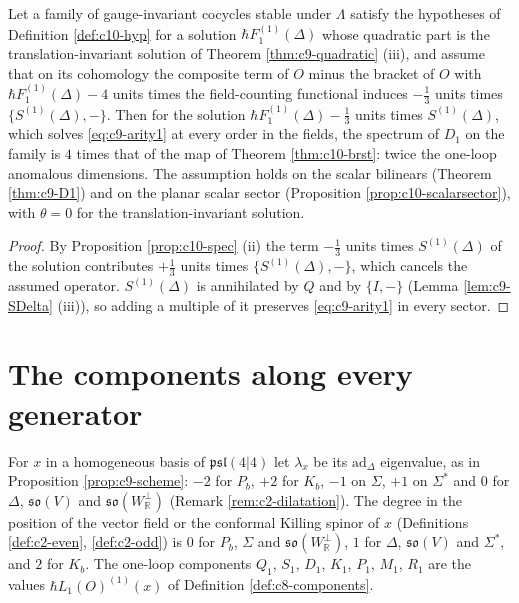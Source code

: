 \begin{corollary}
\label{cor:c10-P7}
Let a family of gauge-invariant cocycles stable under $\Lambda$ satisfy the hypotheses of Definition \ref{def:c10-hyp} for a solution $\hbar F_1^{(1)}(\Delta)$ whose quadratic part is the translation-invariant solution of Theorem \ref{thm:c9-quadratic} (iii), and assume that on its cohomology the composite term of $O$ minus the bracket of $O$ with $\hbar F_1^{(1)}(\Delta)-4$ units times the field-counting functional induces $-\tfrac13$ units times $\{S^{(1)}(\Delta),-\}$. Then for the solution $\hbar F_1^{(1)}(\Delta)-\tfrac13$ units times $S^{(1)}(\Delta)$, which solves \eqref{eq:c9-arity1} at every order in the fields, the spectrum of $D_1$ on the family is $4$ times that of the map of Theorem \ref{thm:c10-brst}: twice the one-loop anomalous dimensions. The assumption holds on the scalar bilinears (Theorem \ref{thm:c9-D1}) and on the planar scalar sector (Proposition \ref{prop:c10-scalarsector}), with $\theta=0$ for the translation-invariant solution.
\end{corollary}

\begin{proof}
By Proposition \ref{prop:c10-spec} (ii) the term $-\tfrac13$ units times $S^{(1)}(\Delta)$ of the solution contributes $+\tfrac13$ units times $\{S^{(1)}(\Delta),-\}$, which cancels the assumed operator. $S^{(1)}(\Delta)$ is annihilated by $Q$ and by $\{I,-\}$ (Lemma \ref{lem:c9-SDelta} (iii)), so adding a multiple of it preserves \eqref{eq:c9-arity1} in every sector.
\end{proof}

\section{The components along every generator}

For $x$ in a homogeneous basis of $\mathfrak{psl}(4|4)$ let $\lambda_x$ be its $\mathrm{ad}_\Delta$ eigenvalue, as in Proposition \ref{prop:c9-scheme}: $-2$ for $P_b$, $+2$ for $K_b$, $-1$ on $\Sigma$, $+1$ on $\Sigma^*$ and $0$ for $\Delta$, $\mathfrak{so}(V)$ and $\mathfrak{so}(W_{\mathbb R}^\perp)$ (Remark \ref{rem:c2-dilatation}). The degree in the position of the vector field or the conformal Killing spinor of $x$ (Definitions \ref{def:c2-even}, \ref{def:c2-odd}) is $0$ for $P_b$, $\Sigma$ and $\mathfrak{so}(W_{\mathbb R}^\perp)$, $1$ for $\Delta$, $\mathfrak{so}(V)$ and $\Sigma^*$, and $2$ for $K_b$. The one-loop components $Q_1$, $S_1$, $D_1$, $K_1$, $P_1$, $M_1$, $R_1$ are the values $\hbar L_1(O)^{(1)}(x)$ of Definition \ref{def:c8-components}.


